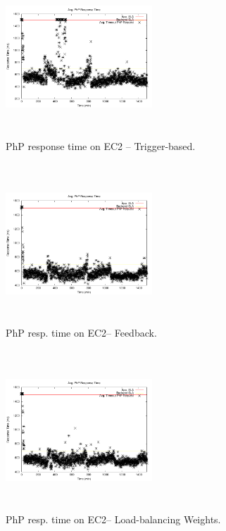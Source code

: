 \begin{figure}
\begin{center}
\includegraphics[width=0.49\textwidth, height=6cm]{./images/heterogeneous/avgTimeout_PhP_naive}
\end{center}
\caption{PhP  response time on EC2 -- Trigger-based.}
\label{naiveEC2}
\end{figure}


\begin{figure}
\begin{center}
\includegraphics[width=0.49\textwidth, height=6cm]{./images/heterogeneous/avgTimeout_PhP_history}
\end{center}
\caption{PhP resp. time on EC2-- Feedback.}
\label{historyEC2}
\end{figure}

\begin{figure}
\begin{center}
\includegraphics[width=0.49\textwidth, height=6cm]{./images/heterogeneous/avgTimeout_PhP_weightHistory}
\end{center}
\caption{ PhP resp. time on EC2-- Load-balancing Weights.}
\label{historyWeightEC2}
\end{figure}

